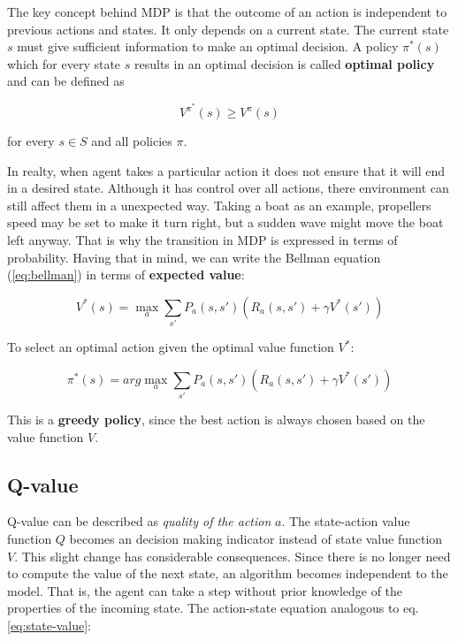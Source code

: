 The key concept behind MDP is that the outcome of an action is independent to previous actions and states. It only depends on a current state. The current state $s$ must give sufficient information to make an optimal decision. A policy $\pi^{*}(s)$ which for every state $s$ results in an optimal decision is called \textbf{optimal policy} and can be defined as 

\begin{equation}
    V^{\pi^{*}}(s) \ge V^{\pi}(s)
\end{equation}

for every $s \in S$ and all policies $\pi$.

In realty, when agent takes a particular action it does not ensure that it will end in a desired state. Although it has control over all actions, there environment can still affect them in a unexpected way. Taking a boat as an example, propellers speed may be set to make it turn right, but a sudden wave might move the boat left anyway. That is why the transition in MDP is expressed in terms of probability. Having that in mind, we can write the Bellman equation (\ref{eq:bellman}) in terms of \textbf{expected value}:

\begin{equation}
    V^{*}(s) = \max_a \sum_{s'} P_a(s, s') \left(R_a(s, s') + \gamma V^{*}(s') \right)
\label{eq:state-value}
\end{equation}

To select an optimal action given the optimal value function $V^{*}$:

\begin{equation}
    \pi^{*}(s) = arg \max_a \sum_{s'} P_a(s, s') \left(R_a(s, s') + \gamma V^{*}(s') \right)
\label{eq:state-value-policy}
\end{equation}

This is a \textbf{greedy policy}, since the best action is always chosen based on the value function $V$.

\subsection{Q-value}
\label{sub:q-val}

Q-value can be described as \emph{quality of the action} $a$. The state-action value function $Q$ becomes an decision making indicator instead of state value function $V$. This slight change has considerable consequences. Since there is no longer need to compute the value of the next state, an algorithm becomes independent to the model. That is, the agent can take a step without prior knowledge of the properties of the incoming state. The action-state equation analogous to eq. \ref{eq:state-value}:

